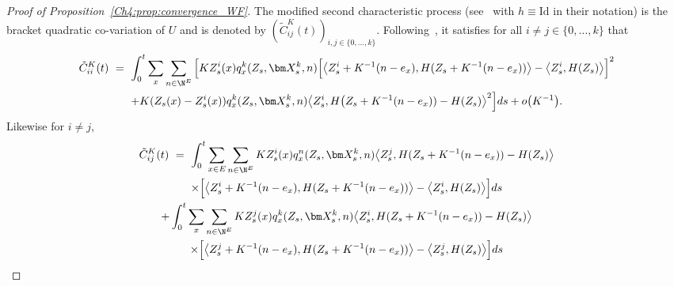 \begin{refsegment}
\begin{proof}[Proof of Proposition~\ref{Ch4:prop:convergence_WF}]
The modified second characteristic process (see~\citet[Definition 2.16]{jacod-shiryaev} with $h\equiv \mathrm{Id}$ in their notation) is the bracket quadratic co-variation of $U$  and is denoted by $(\tilde C_{ij}^K(t))_{i,j\in \{0,\ldots, k\}}$.
Following~\citet{jacod-shiryaev}, it satisfies for all $i\neq j\in\{0,\ldots, k\}$ that
\begin{multline}\label{Ch4:eq:tilde_C_ii^K}
\tilde C_{ii}^K(t)\ =\
  \int_{0}^t \sum_{x}\sum_{n\in\N^E}\Big[K Z^i_s(x)q^k_x(Z_s,\bm X^k_s, n)\Big[\big\langle Z^i_s + K^{-1}(n -e_x), H(Z_s+ K^{-1}(n -e_x)) \big\rangle -  \big\langle Z^i_s, H(Z_s) \big\rangle\Big]^2  \\
  +  K( Z_s(x) -  Z^i_s(x))q^k_x(Z_s,\bm X^k_s, n)\big\langle Z^i_s, H\big(Z_s+ K^{-1}(n -e_x))-  H(Z_s) \big\rangle^2\Big] ds+  o\big(K^{-1}\big).
\end{multline}
Likewise for $i\neq j$,
\begin{multline}\label{Ch4:eq:tilde_C_ij^K}
\tilde C_{ij}^K(t)\ = \ \int_{0}^t \sum_{x\in E}\sum_{n\in\N^E}  K Z^i_s(x)q^n_x(Z_s,\bm X^k_s, n)\big\langle Z^j_s, H(Z_s+ K^{-1}(n -e_x))- H(Z_s)  \big\rangle \\
  \times \Big[\big\langle Z^i_s + K^{-1}(n -e_x), H(Z_s+ K^{-1}(n -e_x)) \big\rangle -  \big\langle Z^i_s, H(Z_s) \big\rangle\Big]ds \\
  +\int_{0}^t  \sum_{x} \sum_{n\in \N^E} K Z^j_s(x)q^{k}_x(Z_s,\bm X^k_s,n) \big\langle Z^i_s, H(Z_s+ K^{-1}(n -e_x))- H(Z_s) \big\rangle  \\
  \times   \Big[\big\langle Z^j_s + K^{-1}(n -e_x), H(Z_s+ K^{-1}(n -e_x)) \big\rangle -  \big\langle Z^j_s, H(Z_s) \big\rangle\Big]ds \\

\end{multline}
\end{proof}
\end{refsegment}
